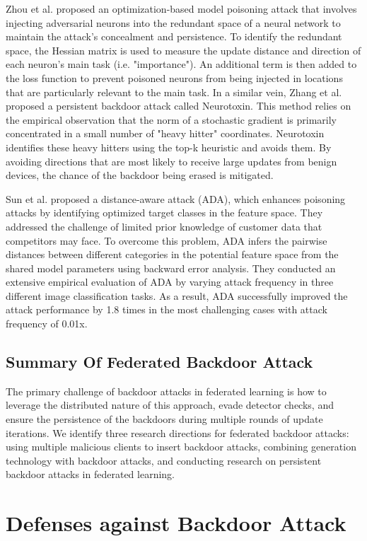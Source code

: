 \documentclass[conference]{IEEEtran}
\begin{document}
Zhou et al.\cite{b63} proposed an optimization-based model poisoning attack that
involves injecting adversarial neurons into the redundant space of a neural network
to maintain the attack's concealment and persistence. To identify the redundant
space, the Hessian matrix is used to measure the update distance and direction of each neuron's main task (i.e. "importance").
An additional term is then added to the loss function to prevent poisoned neurons from being injected
in locations that are particularly relevant to the main task.
In a similar vein, Zhang et al.\cite{b62}
proposed a persistent backdoor attack called Neurotoxin. This method
relies on the empirical observation that the norm of a stochastic gradient
is primarily concentrated in a small number of "heavy hitter" coordinates.
Neurotoxin identifies these heavy hitters using the top-k heuristic and
avoids them. By avoiding directions that are most likely to receive large
updates from benign devices, the chance of the backdoor being erased is mitigated.  

Sun et al. \cite{b65}proposed a distance-aware attack (ADA), which enhances poisoning attacks 
by identifying optimized target classes in the feature space. They addressed the challenge of 
limited prior knowledge of customer data that competitors may face. To overcome this problem, 
ADA infers the pairwise distances between different categories in the potential feature space 
from the shared model parameters using backward error analysis. They conducted an extensive 
empirical evaluation of ADA by varying attack frequency in three different image classification 
tasks. As a result, ADA successfully improved the attack performance by 1.8 times in the most 
challenging cases with attack frequency of 0.01x.

\subsection{Summary Of Federated Backdoor Attack}  
The primary challenge of backdoor attacks in federated learning is how 
to leverage the distributed nature of this approach, evade detector checks, 
and ensure the persistence of the backdoors during multiple rounds of update 
iterations. We identify three research directions for federated backdoor 
attacks: using multiple malicious clients to insert backdoor attacks, 
combining generation technology with backdoor attacks, and conducting 
research on persistent backdoor attacks in federated learning.

\section{Defenses against Backdoor Attack}
\end{document}
